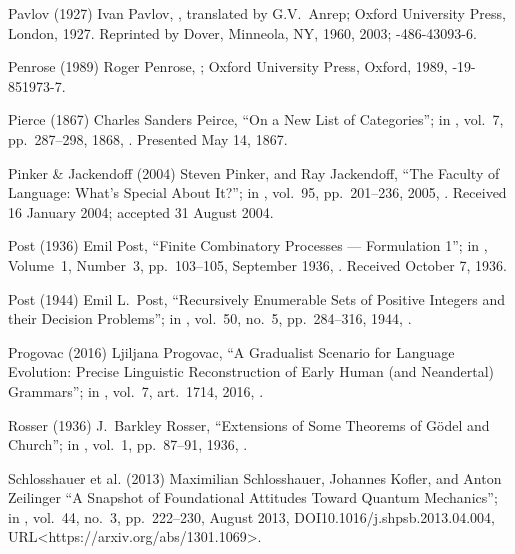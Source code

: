  Pavlov (1927)
Ivan Pavlov,
,
translated by G.V.\ Anrep;
Oxford University Press, London, 1927.
Reprinted by Dover, Minneola, NY, 1960, 2003;
-486-43093-6.

 Penrose (1989)
Roger Penrose, \negthinspace
{};
Oxford University Press, Oxford, 1989,
-19-851973-7.

 Pierce (1867)
Charles Sanders Peirce,
``On a New List of Categories'';
in ,
vol.\ 7, pp.\ 287--298, 1868,
.
Presented May 14, 1867.

 Pinker \& Jackendoff (2004)
Steven Pinker, and Ray Jackendoff,
``The Faculty of Language: What’s Special About It?'';
in ,
vol.\ 95, pp.\ 201--236, 2005,
.
Received 16 January 2004; accepted 31 August 2004.

 Post (1936)
Emil Post,
``Finite Combinatory Processes --- Formulation 1'';
in ,
Volume\ 1, Number\ 3, pp.~103--105, September 1936,
.
Received October 7, 1936.

 Post (1944)
Emil L.\ Post,
``Recursively Enumerable Sets of Positive Integers
  and their Decision Problems'';
in ,
vol.\ 50, no.~5, pp.\ 284--316, 1944,
.

 Progovac (2016)
Ljiljana Progovac,
``A Gradualist
Scenario for Language Evolution:
Precise Linguistic Reconstruction of
Early Human (and Neandertal) Grammars'';
in ,
vol.\ 7, art.\ 1714, 2016,
.

 Rosser (1936)
J.\ Barkley Rosser,
``Extensions of Some Theorems of G\"odel and Church'';
in ,
vol.\ 1, pp.\ 87--91, 1936,
.

 Schlosshauer et al. (2013)
Maximilian Schlosshauer, Johannes Kofler, and Anton Zeilinger
``A Snapshot of Foundational Attitudes Toward Quantum Mechanics'';
in ,
vol.\ 44, no.\ 3, pp.\ 222--230, August 2013,
DOI{10.1016/j.shpsb.2013.04.004},
URL<https://arxiv.org/abs/1301.1069>.

